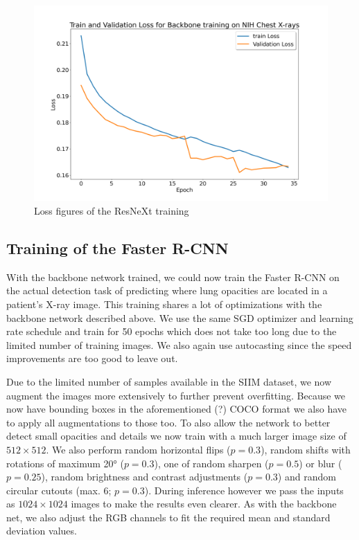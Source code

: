 \begin{figure}
	\centering
	\includegraphics[width=.9\linewidth]{img/loss_backbone_rcnn_35.png}
	\caption{Loss figures of the ResNeXt training}
	\label{fig:resnet_loss}
\end{figure}

\subsection*{Training of the Faster R-CNN}

With the backbone network trained, we could now train the Faster R-CNN on the actual detection task of predicting where lung opacities are located in a patient's X-ray image. This training shares a lot of optimizations with the backbone network described above. We use the same \ac{SGD} optimizer and learning rate schedule and train for 50 epochs which does not take too long due to the limited number of training images. We also again use autocasting since the speed improvements are too good to leave out.

Due to the limited number of samples available in the SIIM dataset, we now augment the images more extensively to further prevent overfitting. Because we now have bounding boxes in the aforementioned (?) COCO format we also have to apply all augmentations to those too. To also allow the network to better detect small opacities and details we now train with a much larger image size of $512 \times 512$. We also perform random horizontal flips ($p=0.3$), random shifts with rotations of maximum 20° ($p=0.3$), one of random sharpen ($p=0.5$) or blur ($p=0.25$), random brightness and contrast adjustments ($p=0.3$) and random circular cutouts (max. 6; $p=0.3$). During inference however we pass the inputs as $1024 \times 1024$ images to make the results even clearer. As with the backbone net, we also adjust the RGB channels to fit the required mean and standard deviation values.


